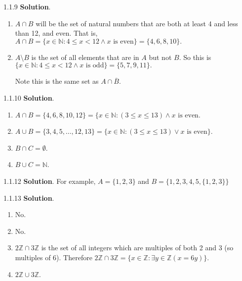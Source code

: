 \documentclass[11pt,]{book}
\theoremstyle{ptxplainnotitle}
\theoremstyle{ptxplaintitle}
\theoremstyle{ptxdefinitionnotitle}
\theoremstyle{ptxdefinitiontitle}
\theoremstyle{ptxdefinitionnotitle}
\theoremstyle{ptxdefinitiontitle}
\theoremstyle{ptxdefinitionnotitle}
\theoremstyle{ptxdefinitiontitle}
\theoremstyle{ptxdefinitiontitlenonumber}
\theoremstyle{ptxdefinitiontitlenonumber}
\numberwithin{equation}{chapter}
\newcommand{\N}{\mathbb N}
\newcommand{\Z}{\mathbb Z}
\newcommand{\st}{:}
\renewcommand{\bar}{\overline}
\newcommand{\lt}{<}
\begin{document}
\begin{divisionexercise}{1.1.9}
\textbf{Solution}.\quad%
\hypertarget{p-929}{}%
\leavevmode%
\begin{enumerate}[label=\alph*.]
\item\hypertarget{li-403}{}\hypertarget{p-930}{}%
\(A \cap B\) will be the set of natural numbers that are both at least 4 and less than 12, and even.  That is, \(A \cap B = \{x \in \N \st 4\le x \lt 12 \wedge x \text{ is even}\} = \{4, 6, 8, 10\}\text{.}\)%
\item\hypertarget{li-404}{}\hypertarget{p-931}{}%
\(A \setminus B\) is the set of all elements that are in \(A\) but not \(B\text{.}\)  So this is \(\{x \in \N \st 4 \le x \lt 12 \wedge x \text{ is odd}\} = \{5,7,9,11\}\text{.}\)%
\par
\hypertarget{p-932}{}%
Note this is the same set as \(A \cap \bar{B}\text{.}\)%
\end{enumerate}
%
\end{divisionexercise}%
\begin{divisionexercise}{1.1.10}
\textbf{Solution}.\quad%
\hypertarget{p-938}{}%
\leavevmode%
\begin{enumerate}[label=(\alph*)]
\item\hypertarget{li-409}{}\(A \cap B = \{4,6,8,10,12\} = \{x \in \N \st (3 \le x \le 13) \wedge x \mbox{ is even}\).%
\item\hypertarget{li-410}{}\(A \cup B = \{3, 4, 5, \ldots, 12, 13\} = \{x \in \N \st (3 \le x \le 13) \vee x \mbox{ is even} \}\).%
\item\hypertarget{li-411}{}\(B \cap C = \emptyset\).%
\item\hypertarget{li-412}{}\(B \cup C = \N\).%
\end{enumerate}
%
\end{divisionexercise}%
\begin{divisionexercise}{1.1.12}
\textbf{Solution}.\quad%
\hypertarget{p-941}{}%
For example, \(A = \{1,2,3\}\) and \(B = \{1,2,3,4,5,\{1,2,3\}\}\)%
\end{divisionexercise}%
\begin{divisionexercise}{1.1.13}
\textbf{Solution}.\quad%
\hypertarget{p-947}{}%
\leavevmode%
\begin{enumerate}[label=(\alph*)]
\item\hypertarget{li-417}{}\hypertarget{p-948}{}%
No.%
\item\hypertarget{li-418}{}\hypertarget{p-949}{}%
No.%
\item\hypertarget{li-419}{}\(2\Z \cap 3\Z\) is the set of all integers which are multiples of both 2 and 3 (so multiples of 6). Therefore \(2\Z \cap 3\Z = \{x \in \Z \st \exists y\in \Z(x = 6y)\}\).%
\item\hypertarget{li-420}{}\(2\Z \cup 3\Z\).%
\end{enumerate}
%
\end{divisionexercise}%
\end{document}
